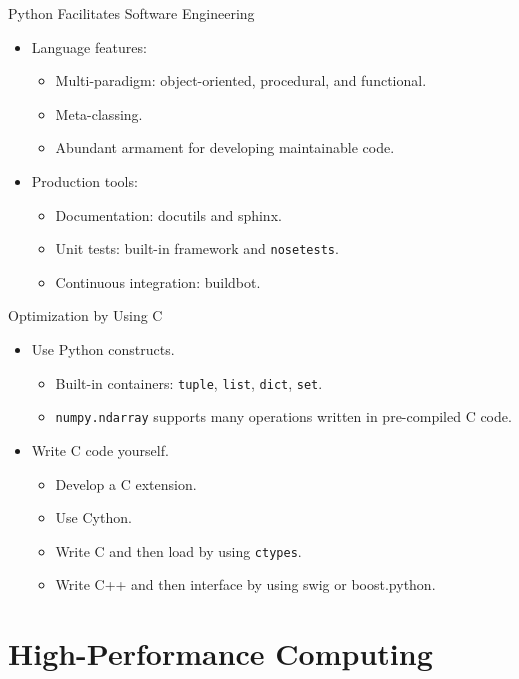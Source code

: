 \documentclass[dvips,xcolor=pst]{beamer}
\begin{document}
\begin{frame}{
%
Python Facilitates Software Engineering
%
}
\begin{itemize} \large
  \item Language features:
  \begin{itemize} \large
    \item Multi-paradigm: object-oriented, procedural, and functional.
    \item Meta-classing.
    \item Abundant armament for developing maintainable code.
  \end{itemize}
  \item Production tools:
  \begin{itemize} \large
    \item Documentation: docutils and sphinx.
    \item Unit tests: built-in framework and \texttt{nosetests}.
    \item Continuous integration: buildbot.
  \end{itemize}
\end{itemize}
\end{frame}

\begin{frame}{
%
Optimization by Using C
%
}
\begin{itemize} \large
  \item Use Python constructs.
  \begin{itemize} \large
    \item Built-in containers: \texttt{tuple}, \texttt{list}, \texttt{dict},
    \texttt{set}.
    \item \texttt{numpy.ndarray} supports many operations written in
    pre-compiled C code.
  \end{itemize}
  \item Write C code yourself.
  \begin{itemize} \large
    \item Develop a C extension.
    \item Use Cython.
    \item Write C and then load by using \texttt{ctypes}.
    \item Write C++ and then interface by using swig or boost.python.
  \end{itemize}
\end{itemize}
\end{frame}

\section{High-Performance Computing}
\end{document}
